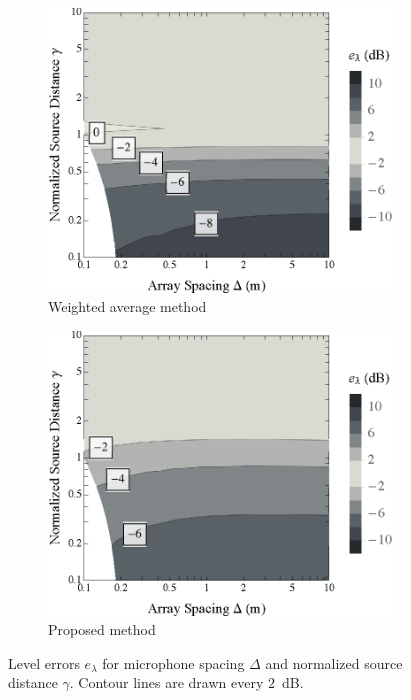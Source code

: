 \begin{figure}[t]
    	\centering
    	\begin{subfigure}[b]{0.49\textwidth}
        		\includegraphics[width=\textwidth]{08_proposed_method/figures/audibleEnergy_contour_xf.eps}
        		\caption{Weighted average method}
        		\label{fig:08_Proposed_Method:Level_Errors:XF}
    	\end{subfigure}
	\hfill
	\begin{subfigure}[b]{0.49\textwidth}
        		\includegraphics[width=\textwidth]{08_proposed_method/figures/audibleEnergy_contour_validhybrid.eps}
        		\caption{Proposed method}
        		\label{fig:08_Proposed_Method:Level_Errors:Hybrid}
    	\end{subfigure}
	
    	\caption[Contour plots of level errors for each interpolation method.]{
	Level errors $e_\lambda$ for microphone spacing $\Delta$ and normalized source distance $\gamma$.
  Contour lines are drawn every $2$~dB.}
    	\label{fig:08_Proposed_Method:Level_Errors}
\end{figure}

